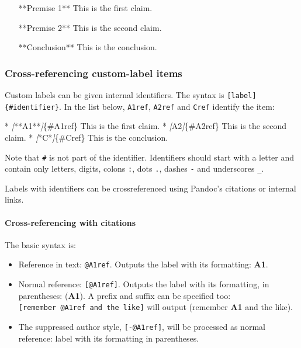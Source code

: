 \documentclass[
]{article}
\newenvironment{Shaded}{}{}
\newcommand{\CommentTok}[1]{\textcolor[rgb]{0.38,0.63,0.69}{\textit{#1}}}
\newcommand{\NormalTok}[1]{#1}
\newcommand{\OtherTok}[1]{\textcolor[rgb]{0.00,0.44,0.13}{#1}}
\newcommand{\SpecialStringTok}[1]{\textcolor[rgb]{0.73,0.40,0.53}{#1}}
\providecommand{\tightlist}{%
  \setlength{\itemsep}{0pt}\setlength{\parskip}{0pt}}
\begin{document}
\begin{itemize}
\tightlist

\item[**Premise 1**] This is the first claim.

\item[**Premise 2**] This is the second claim.

\item[**Conclusion**] This is the conclusion.

\end{itemize}

\hypertarget{cross-referencing-custom-label-items}{%
\subsubsection{Cross-referencing custom-label
items}\label{cross-referencing-custom-label-items}}

Custom labels can be given internal identifiers. The syntax is
\texttt{{[}label{]}\{\#identifier\}}. In the list below, \texttt{A1ref},
\texttt{A2ref} and \texttt{Cref} identify the item:

\begin{Shaded}
\begin{Highlighting}[]
\SpecialStringTok{* }\CommentTok{[}\OtherTok{**A1**}\CommentTok{]}\NormalTok{\{\#A1ref\} This is the first claim.}
\SpecialStringTok{* }\CommentTok{[}\OtherTok{A2}\CommentTok{]}\NormalTok{\{\#A2ref\} This is the second claim.}
\SpecialStringTok{* }\CommentTok{[}\OtherTok{*C*}\CommentTok{]}\NormalTok{\{\#Cref\} This is the conclusion.}
\end{Highlighting}
\end{Shaded}

Note that \texttt{\#} is not part of the identifier. Identifiers should
start with a letter and contain only letters, digits, colons \texttt{:},
dots \texttt{.}, dashes \texttt{-} and underscores \texttt{\_}.

Labels with identifiers can be crossreferenced using Pandoc's citations
or internal links.

\hypertarget{cross-referencing-with-citations}{%
\paragraph{Cross-referencing with
citations}\label{cross-referencing-with-citations}}

The basic syntax is:

\begin{itemize}
\tightlist
\item
  Reference in text: \texttt{@A1ref}. Outputs the label with its
  formatting: \textbf{A1}.
\item
  Normal reference: \texttt{{[}@A1ref{]}}. Outputs the label with its
  formatting, in parentheses: (\textbf{A1}). A prefix and suffix can be
  specified too: \texttt{{[}remember\ @A1ref\ and\ the\ like{]}} will
  output (remember \textbf{A1} and the like).
\item
  The suppressed author style, \texttt{{[}-@A1ref{]}}, will be processed
  as normal reference: label with its formatting in parentheses.
\end{itemize}
\end{document}
